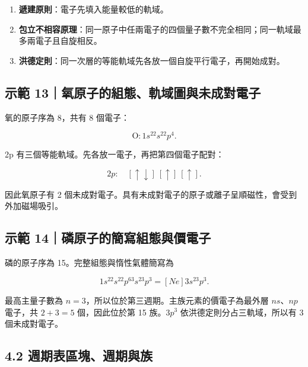 \documentclass[11pt,a4paper]{article}
\providecommand{\tightlist}{%
  \setlength{\itemsep}{0pt}\setlength{\parskip}{0pt}}
\begin{document}
\begin{enumerate}
\def\labelenumi{\arabic{enumi}.}
\tightlist
\item
  \textbf{遞建原則}：電子先填入能量較低的軌域。
\item
  \textbf{包立不相容原理}：同一原子中任兩電子的四個量子數不完全相同；同一軌域最多兩電子且自旋相反。
\item
  \textbf{洪德定則}：同一次層的等能軌域先各放一個自旋平行電子，再開始成對。
\end{enumerate}

\begin{HandoutWorkedExample}

\subsection{示範 13｜氧原子的組態、軌域圖與未成對電子}\label{ux793aux7bc4-13ux6c27ux539fux5b50ux7684ux7d44ux614bux8eccux57dfux5716ux8207ux672aux6210ux5c0dux96fbux5b50}

氧的原子序為 8，共有 8 個電子：

\[
\mathrm O:1s^22s^22p^4.
\]

2p 有三個等能軌域。先各放一電子，再把第四個電子配對：

\[
2p:\quad [\uparrow\downarrow]\ [\uparrow]\ [\uparrow].
\]

因此氧原子有 2 個未成對電子。具有未成對電子的原子或離子呈順磁性，會受到外加磁場吸引。

\end{HandoutWorkedExample}

\begin{HandoutWorkedExample}

\subsection{示範 14｜磷原子的簡寫組態與價電子}\label{ux793aux7bc4-14ux78f7ux539fux5b50ux7684ux7c21ux5bebux7d44ux614bux8207ux50f9ux96fbux5b50}

磷的原子序為 15。完整組態與惰性氣體簡寫為

\[
1s^22s^22p^63s^23p^3=[Ne]3s^23p^3.
\]

最高主量子數為 \(n=3\)，所以位於第三週期。主族元素的價電子為最外層 \(ns\)、\(np\) 電子，共 \(2+3=5\) 個，因此位於第 15 族。\(3p^3\) 依洪德定則分占三軌域，所以有 3 個未成對電子。

\end{HandoutWorkedExample}

\subsection{4.2 週期表區塊、週期與族}\label{ux9031ux671fux8868ux5340ux584aux9031ux671fux8207ux65cf}
\end{document}
